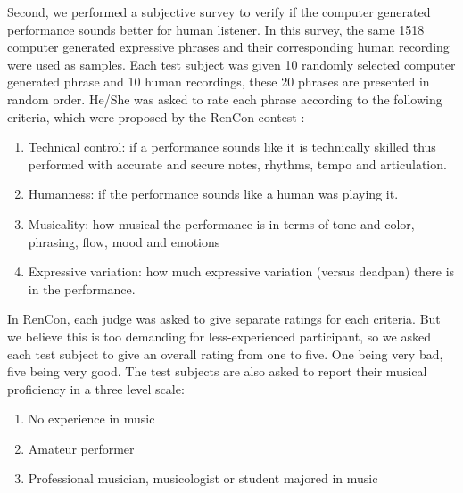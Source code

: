 Second, we performed a subjective survey to verify if the computer generated performance sounds better for human listener.  In this survey, the same 1518 computer generated expressive phrases and their corresponding human recording were used as samples. Each test subject was given 10 randomly selected computer generated phrase and 10 human recordings, these 20 phrases are presented in random order. He/She was asked to rate each phrase according to the following criteria, which were proposed by the RenCon contest \cite{RenCon}:
\begin{enumerate}
   \item Technical control: if a performance sounds like it is technically skilled thus performed with accurate and secure notes, rhythms, tempo and articulation.
   \item  Humanness: if the performance sounds like a human was playing it.
   \item  Musicality: how musical the performance is in terms of tone and color, phrasing, flow, mood and emotions
   \item Expressive variation: how much expressive variation (versus deadpan) there is in the performance.
\end{enumerate}

In RenCon, each judge was asked to give separate ratings for each criteria. But we believe this is too demanding for less-experienced participant, so we asked each test subject to give an overall rating from one to five. One being very bad, five being very good. The test subjects are also asked to report their musical proficiency in a three level scale:
\begin{enumerate}
   \item No experience in music 
   \item Amateur performer
   \item Professional musician, musicologist or student majored in music
\end{enumerate}


